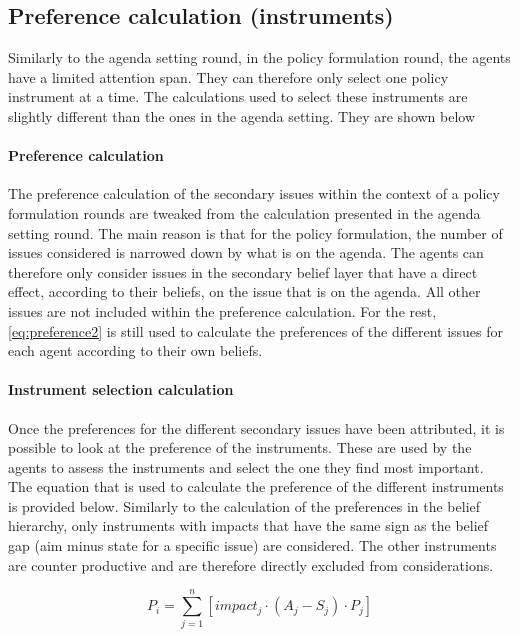 \subsection{Preference calculation (instruments)}

Similarly to the agenda setting round, in the policy formulation round, the agents have a limited attention span. They can therefore only select one policy instrument at a time. The calculations used to select these instruments are slightly different than the ones in the agenda setting. They are shown below

\paragraph{Preference calculation}

The preference calculation of the secondary issues within the context of a policy formulation rounds are tweaked from the calculation presented in the agenda setting round. The main reason is that for the policy formulation, the number of issues considered is narrowed down by what is on the agenda. The agents can therefore only consider issues in the secondary belief layer that have a direct effect, according to their beliefs, on the issue that is on the agenda. All other issues are not included within the preference calculation. For the rest, \autoref{eq:preference2} is still used to calculate the preferences of the different issues for each agent according to their own beliefs.

\paragraph{Instrument selection calculation}

Once the preferences for the different secondary issues have been attributed, it is possible to look at the preference of the instruments. These are used by the agents to assess the instruments and select the one they find most important. The equation that is used to calculate the preference of the different instruments is provided below. Similarly to the calculation of the preferences in the belief hierarchy, only instruments with impacts that have the same sign as the belief gap (aim minus state for a specific issue) are considered. The other instruments are counter productive and are therefore directly excluded from considerations.

\begin{equation}
P_i = \sum_{j=1}^n \left[ impact_j \cdot \left( A_j - S_j \right) \cdot P_j \right]
\end{equation}

